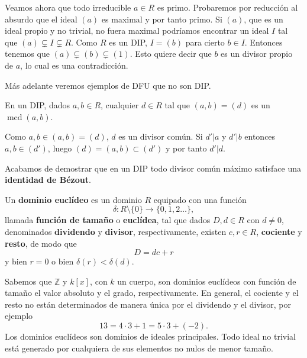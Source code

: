 Veamos ahora que todo irreducible \(a\in R\) es primo. Probaremos por
reducción al absurdo que el ideal \((a)\) es maximal y por tanto primo.
Si \((a)\), que es un ideal propio y no trivial, no fuera maximal
podríamos encontrar un ideal \(I\) tal que
\((a)\subsetneq I\subsetneq R\). Como \(R\) es un DIP, \(I=(b)\) para
cierto \(b\in I\). Entonces tenemos que
\((a)\subsetneq(b)\subsetneq(1)\). Esto quiere decir que \(b\) es un
divisor propio de \(a\), lo cual es una contradicción. 

Más adelante veremos ejemplos de DFU que no son DIP.


En un DIP, dados \(a,b\in R\), cualquier \(d\in R\) tal que
\((a,b)=(d)\) es un \(\operatorname{mcd}(a,b)\). 


Como \(a,b\in (a,b)=(d)\), \(d\) es un divisor común. Si \(d'|a\) y
\(d'|b\) entonces \(a,b\in (d')\), luego \((d)=(a,b)\subset (d')\) y por
tanto \(d'|d\). 

Acabamos de demostrar que en un DIP todo divisor común máximo satisface
una \textbf{identidad de Bézout}.


Un \textbf{dominio euclídeo} es un dominio \(R\) equipado con una
función
\[\delta\colon R\setminus\{0\}\longrightarrow\{0,1,2\dots\},\]
llamada \textbf{función de tamaño} o \textbf{euclídea}, tal que dados
\(D,d\in R\) con \(d\neq 0\), denominados \textbf{dividendo} y
\textbf{divisor}, respectivamente, existen \(c,r\in R\),
\textbf{cociente} y \textbf{resto}, de modo que \[D=dc+r\] y bien
\(r=0\) o bien \(\delta( r )<\delta(d)\). 


Sabemos que \(\mathbb Z\) y \(k[x]\), con \(k\) un cuerpo, son dominios
euclídeos con función de tamaño el valor absoluto y el grado,
respectivamente. En general, el cociente y el resto no están
determinados de manera única por el dividendo y el divisor, por ejemplo
\[13=4\cdot 3+1=5\cdot 3+(-2).\] Los dominios euclídeos son dominios de
ideales principales. Todo ideal no trivial está generado por cualquiera
de sus elementos no nulos de menor tamaño. 

